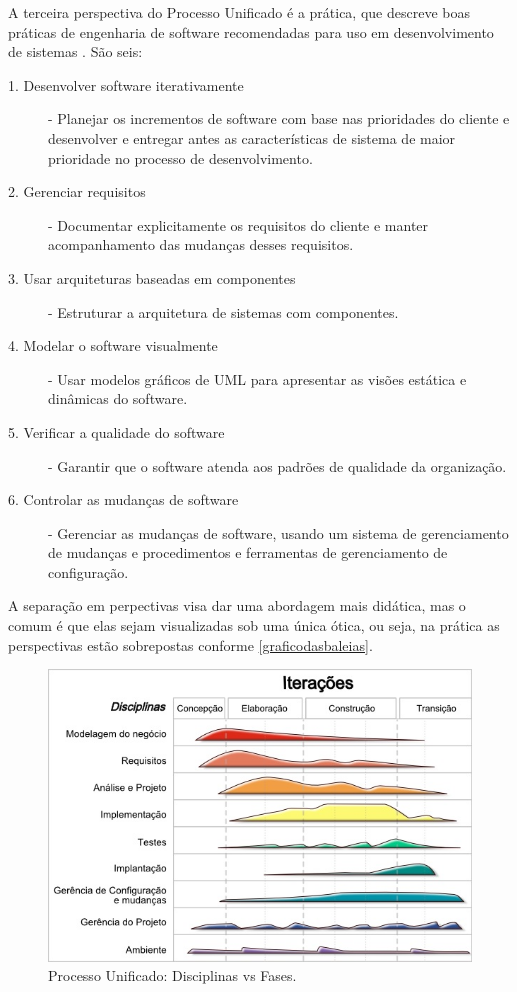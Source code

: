 \documentclass[
	article,			%
	11pt,				%
	oneside,			%
	a4paper,			%
	english,			%
	brazil,				%
	sumario=tradicional
	]{abntex2}
\begin{document}
A terceira perspectiva do Processo Unificado é a prática, que descreve boas
práticas de engenharia de software recomendadas para uso em desenvolvimento de
sistemas \cite{sommerville2007}. São seis:

\begin{description}
   \item[1. Desenvolver software iterativamente] - Planejar os incrementos de
   software com base nas prioridades do cliente e desenvolver e entregar antes
   as características de sistema de maior prioridade no processo de
   desenvolvimento.
   \item[2. Gerenciar requisitos] - Documentar explicitamente os requisitos do
   cliente e manter acompanhamento das mudanças desses requisitos.
   \item[3. Usar arquiteturas baseadas em componentes] - Estruturar a
   arquitetura de sistemas com componentes.
   \item[4. Modelar o software visualmente] - Usar modelos gráficos de UML para
   apresentar as visões estática e dinâmicas do software.
   \item[5. Verificar a qualidade do software] - Garantir que o software atenda
   aos padrões de qualidade da organização.
   \item[6. Controlar as mudanças de software] - Gerenciar as mudanças de
   software, usando um sistema de gerenciamento de mudanças e procedimentos e
   ferramentas de gerenciamento de configuração.
\end{description}

A separação em perpectivas visa dar uma abordagem mais didática, mas o comum é
que elas sejam visualizadas sob uma única ótica, ou seja, na prática as
perspectivas estão sobrepostas conforme \autoref{graficodasbaleias}.


\begin{figure}[htb]
   \caption{Processo Unificado: Disciplinas vs Fases.}
   \label{graficodasbaleias}
   \begin{center}
       \includegraphics[scale=0.8]{graficodasbaleias.jpg}
   \end{center}
\end{figure}
\end{document}
